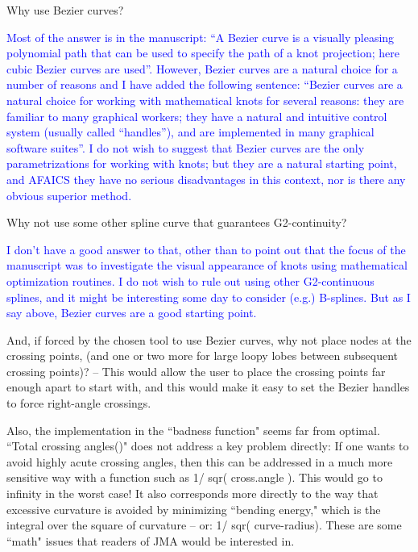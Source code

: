 \documentclass[12pt]{article}
\begin{document}
Why use Bezier curves? 

\textcolor{blue}{Most of the answer is in the manuscript: ``A Bezier
  curve is a visually pleasing polynomial path that can be used to
  specify the path of a knot projection; here cubic Bezier curves are
  used''.  However, Bezier curves are a natural choice for a number of
  reasons and I have added the following sentence: ``Bezier curves are
  a natural choice for working with mathematical knots for several
  reasons: they are familiar to many graphical workers; they have a
  natural and intuitive control system (usually called ``handles''),
  and are implemented in many graphical software suites''.  I do not
  wish to suggest that Bezier curves are the only parametrizations for
  working with knots; but they are a natural starting point, and
  AFAICS they have no serious disadvantages in this context, nor is
  there any obvious superior method.}

Why not use some other spline curve that guarantees G2-continuity?

\textcolor{blue}{I don't have a good answer to that, other than to
  point out that the focus of the manuscript was to investigate the
  visual appearance of knots using mathematical optimization routines.
  I do not wish to rule out using other G2-continuous splines, and it
  might be interesting some day to consider (e.g.) B-splines.  But as
  I say above, Bezier curves are a good starting point.}

And, if forced by the chosen tool to use Bezier curves, why not place
nodes at the crossing points, (and one or two more for large loopy
lobes between subsequent crossing points)?  -- This would allow the
user to place the crossing points far enough apart to start with, and
this would make it easy to set the Bezier handles to force right-angle
crossings.




Also, the implementation in the ``badness function" seems far from
optimal.  ``Total crossing angles()" does not address a key problem
directly: If one wants to avoid highly acute crossing angles, then
this can be addressed in a much more sensitive way with a function
such as 1/ sqr( cross.angle ).  This would go to infinity in the worst
case!  It also corresponds more directly to the way that excessive
curvature is avoided by minimizing ``bending energy," which is the
integral over the square of curvature -- or: 1/ sqr( curve-radius).
These are some ``math" issues that readers of JMA would be interested
in.
\end{document}
